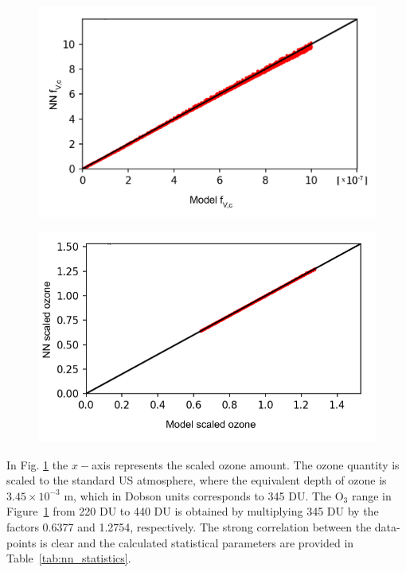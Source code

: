 \documentclass{optica-article}
\begin{document}
\begin{figure}[H]
	\centering
	\begin{minipage}{0.6\textwidth}
		\centering
		\includegraphics[width=1\linewidth]{NN_COD_val.jpg}
		\label{fig:nncodvalid}
	\end{minipage}
	\begin{minipage}{0.6\textwidth}
		\centering
		\includegraphics[width=1\linewidth]{NN_ozone_val.pdf}
		\label{fig:nnozonevalid}
	\end{minipage}
\end{figure}

In Fig. \ref{fig:nnozonevalid} the $x-$axis represents the scaled ozone amount.
The ozone quantity is scaled to the standard US atmosphere, where the equivalent depth of ozone is $3.45 \times 10^{-3}$ m, which in Dobson units corresponds to 345 DU. 
The O$_3$ range in Figure~\ref{fig:nnozonevalid} from 220 DU to  440 DU is obtained by multiplying 345 DU by the factors 0.6377 and 1.2754, respectively. 
The strong correlation between the data-points is clear and the calculated statistical parameters are provided in Table~\ref{tab:nn_statistics}.
\end{document}

